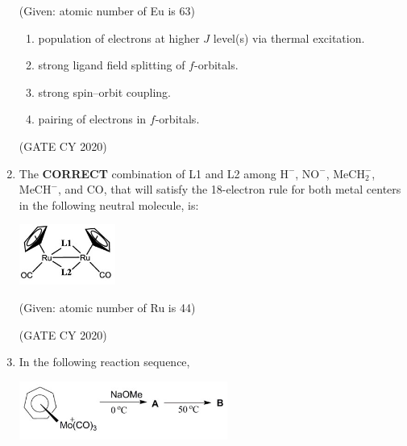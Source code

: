 \documentclass[12pt]{article}
\begin{document}
\begin{enumerate}
(Given: atomic number of Eu is 63)

\begin{enumerate}
\item population of electrons at higher \(J\) level(s) via thermal excitation.
\item strong ligand field splitting of \(f\)-orbitals.
\item strong spin–orbit coupling.
\item pairing of electrons in \(f\)-orbitals.
\end{enumerate}
\hfill (GATE CY 2020)

\item The \textbf{CORRECT} combination of L1 and L2 among \(\mathrm{H^-}\), \(\mathrm{NO^-}\), \(\mathrm{MeCH_2^-}\), \(\mathrm{MeCH^-}\), and CO, that will satisfy the 18-electron rule for both metal centers in the following neutral molecule, is:

\begin{center}
\includegraphics[width=0.5\columnwidth]{figs/q36.png}
 \label{fig:q36}
\end{center}

(Given: atomic number of Ru is 44)

\begin{enumerate}
\end{enumerate}
\hfill (GATE CY 2020)

\item In the following reaction sequence,

\begin{center}
\includegraphics[width=0.6\columnwidth]{figs/q37.png}
 \label{fig:q37}
\end{center}


\end{enumerate}
\end{document}
